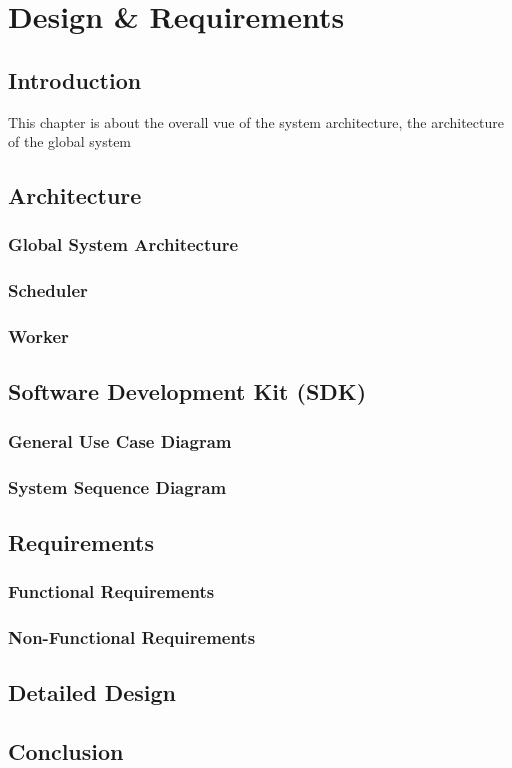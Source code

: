 

\chapter{Design \& Requirements}

\ifpdf
    \graphicspath{}
\else
    \graphicspath{}
\fi


\section{Introduction}
    This chapter is about the overall vue of the system architecture, the architecture of the global system

\section{Architecture}
    \subsection{Global System Architecture}
    \subsection{Scheduler}
    \subsection{Worker}

\section{Software Development Kit (SDK)}

\subsection{General Use Case Diagram}
\subsection{System Sequence Diagram}

\section{Requirements}
    \subsection{Functional Requirements}
    \subsection{Non-Functional Requirements}

\section{Detailed Design}

\section{Conclusion}

